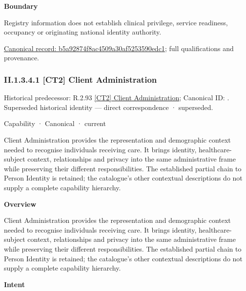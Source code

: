 \textbf{Boundary}



Registry information does not establish clinical privilege, service readiness, occupancy or originating national identity authority.


{\footnotesize \href{../../../../continuum/strategy/capability/b5a92874f8ac4509a30af5253590edc1.md}{Canonical record: b5a92874f8ac4509a30af5253590edc1}; full qualifications and provenance.}\par
\subsubsection*{II.1.3.4.1 [CT2] Client Administration}
\label{navigation:II.1.3.4.1}

{\small Historical predecessor: R.2.93 \hyperref[element:70d2a44a0442441f8b306b82b297bb8a]{[CT2] Client Administration}; Canonical ID: \texttt{}. Superseded historical identity — direct correspondence · superseded.}\par
\label{element:f0885472cced4bccbcce1568bf0360dc}
{\small Capability · Canonical · current}\par

Client Administration provides the representation and demographic context needed to recognise individuals receiving care. It brings identity, healthcare-subject context, relationships and privacy into the same administrative frame while preserving their different responsibilities. The established partial chain to Person Identity is retained; the catalogue's other contextual descriptions do not supply a complete capability hierarchy.



\textbf{Overview}



Client Administration provides the representation and demographic context needed to recognise individuals receiving care. It brings identity, healthcare-subject context, relationships and privacy into the same administrative frame while preserving their different responsibilities. The established partial chain to Person Identity is retained; the catalogue's other contextual descriptions do not supply a complete capability hierarchy.



\textbf{Intent}



